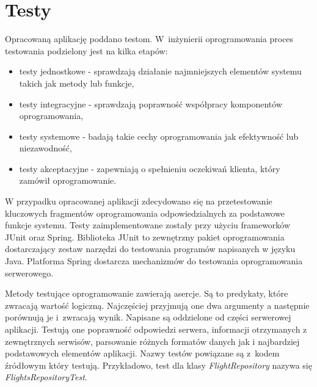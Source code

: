 \documentclass[12pt, twoside]{report}
\begin{document}
\chapter{Testy}
Opracowaną aplikację poddano testom. W~inżynierii oprogramowania proces testowania podzielony jest na kilka etapów:
\begin{itemize}[noitemsep,topsep=0pt]
\item testy jednostkowe - sprawdzają działanie najmniejszych elementów systemu takich jak metody lub funkcje,
\item testy integracyjne - sprawdzają poprawność współpracy komponentów oprogramowania,
\item testy systemowe - badają takie cechy oprogramowania jak efektywność lub niezawodność,
\item testy akceptacyjne - zapewniają o spełnieniu oczekiwań klienta, który zamówił oprogramowanie.
\end{itemize}

W przypadku opracowanej aplikacji zdecydowano się na przetestowanie kluczowych fragmentów oprogramowania odpowiedzialnych za podstawowe funkcje systemu. Testy zaimplementowane zostały przy użyciu frameworków JUnit oraz Spring. Biblioteka JUnit to zewnętrzny pakiet oprogramowania dostarczający zestaw narzędzi do testowania programów napisanych w języku Java.  Platforma Spring dostarcza mechanizmów do testowania oprogramowania serwerowego.

Metody testujące oprogramowanie zawierają asercje. Są to predykaty, które zwracają wartość logiczną. Najczęściej przyjmują one dwa argumenty a następnie porównują je i~zwracają wynik\cite{assertion}. Napisane są oddzielone od części serwerowej aplikacji. Testują one poprawność odpowiedzi serwera, informacji otrzymanych z zewnętrznych serwisów, parsowanie różnych formatów danych jak i najbardziej podstawowych elementów aplikacji. Nazwy testów powiązane są z~kodem źródłowym który testują. Przykładowo, test dla klasy \textit{FlightRepository} nazywa się \textit{FlightsRepositoryTest}.
\end{document}
